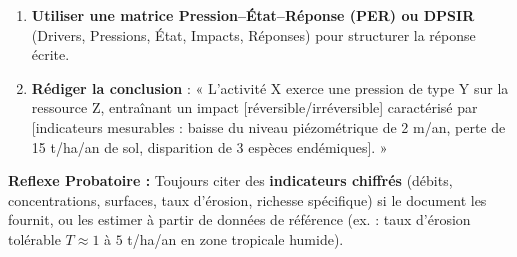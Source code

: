 \documentclass[11pt]{article}
\begin{document}
\begin{methode}
\begin{enumerate}
        \item \textbf{Utiliser une matrice Pression–État–Réponse (PER) ou DPSIR} (Drivers, Pressions, État, Impacts, Réponses) pour structurer la réponse écrite.
        \item \textbf{Rédiger la conclusion} : « L'activité X exerce une pression de type Y sur la ressource Z, entraînant un impact [réversible/irréversible] caractérisé par [indicateurs mesurables : baisse du niveau piézométrique de 2 m/an, perte de 15 t/ha/an de sol, disparition de 3 espèces endémiques]. »
    \end{enumerate}
    \textbf{Reflexe Probatoire :} Toujours citer des \textbf{indicateurs chiffrés} (débits, concentrations, surfaces, taux d'érosion, richesse spécifique) si le document les fournit, ou les estimer à partir de données de référence (ex. : taux d'érosion tolérable $T \approx 1$ à $5$ t/ha/an en zone tropicale humide).
\end{methode}
\end{document}

